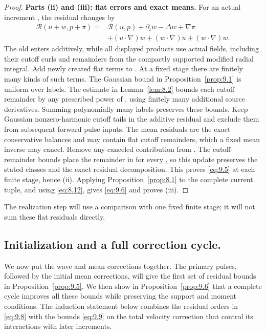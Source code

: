 \begin{proof}
\noindent\textbf{Parts (ii) and (iii): flat errors and exact means.} For an actual increment
, the residual changes by
\[
\begin{aligned}
\mathscr R(u+w,p+\pi)={}&\mathscr R(u,p)+\partial_t w-\Delta w+\nabla\pi\\
&+(u\mathbin{\cdot}\nabla)w+(w\mathbin{\cdot}\nabla)u+(w\mathbin{\cdot}\nabla)w.
\end{aligned}
\]
The old  enters additively, while all displayed products use actual
fields, including their cutoff curls and remainders from the compactly supported modified radial
integral. Add newly created flat terms to . At a fixed stage there
are finitely many kinds of such terms. The Gaussian bound in Proposition~\ref{prop:9.1} is uniform
over labels. The estimate in Lemma~\ref{lem:8.2} bounds each cutoff remainder by any prescribed
power of , using finitely many additional source derivatives. Summing
polynomially many labels preserves these bounds. Keep Gaussian nonzero-harmonic cutoff tails in the
additive residual and exclude them from subsequent forward pulse inputs. The mean residuals
 are the exact conservative balances and may contain flat cutoff
remainders, which a fixed mean inverse may cancel. Remove any canceled contribution from
. The cutoff-remainder bounds place the remainder in
 for every , so this update
preserves the stated classes and the exact residual decomposition. This proves \eqref{eq:9.5} at each
finite stage, hence (ii). Applying Proposition~\ref{prop:8.1} to the complete current tuple, and using
\eqref{eq:8.12}, gives \eqref{eq:9.6} and proves (iii).
\end{proof}

The realization step will use a comparison with one fixed finite stage; it will not sum these flat
residuals directly.

%
\subsection{Initialization and a full correction cycle.}\label{sec:9.3}
We now put the wave and mean corrections together. The primary pulses, followed by the initial mean
corrections, will give the first set of residual bounds in Proposition~\ref{prop:9.5}. We then show in
Proposition~\ref{prop:9.6} that a complete cycle improves all these bounds while preserving the
support and moment conditions. The induction statement below combines the residual orders in
\eqref{eq:9.8} with the bounds \eqref{eq:9.9} on the total velocity correction that control its
interactions with later increments.

